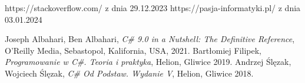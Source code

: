 \documentclass[polish,12pt,twoside,a4paper]{report}
\begin{document}



\newpage

\newpage

\newpage

\newpage

\newpage

\newpage

\newpage

\newpage

\begin{thebibliography}{6}


 https://stackoverflow.com/ z dnia 29.12.2023
 https://pasja-informatyki.pl/ z dnia 03.01.2024

Joseph Albahari, Ben Albahari, {\it C\# 9.0 in a Nutshell: The Definitive Reference},  O'Reilly Media, Sebastopol, Kalifornia, USA, 2021.
Bartłomiej Filipek, {\it Programowanie w C\#. Teoria i praktyka}, Helion, Gliwice 2019.
Andrzej Ślęzak, Wojciech Ślęzak, {\it C\# Od Podstaw. Wydanie V}, Helion, Gliwice 2018.
\end{thebibliography}
\newpage
\end{document}
